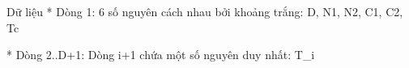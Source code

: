 Dữ liệu
* Dòng 1: 6 số nguyên cách nhau bởi khoảng trắng: D, N1, N2, C1, C2, Tc   

    * Dòng 2..D+1: Dòng i+1 chứa một số nguyên duy nhất: T\_i